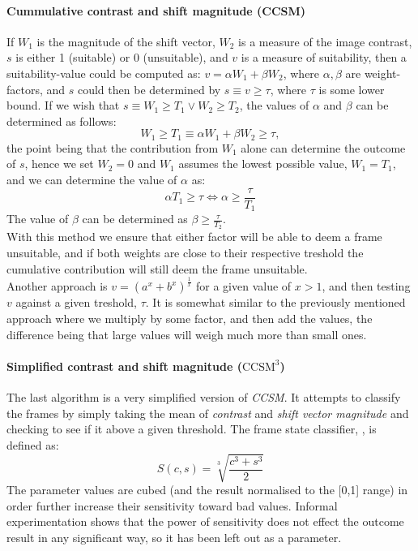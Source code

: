 \paragraph{Cummulative contrast and shift magnitude (CCSM)}
If $W_{1}$ is the magnitude of the shift vector, $W_{2}$ is a measure of the image contrast, $s$ is either 1 (suitable) or 0 (unsuitable), and $v$ is a measure of suitability, then a suitability-value could be computed as: $v = \alpha W_{1} + \beta W_{2}$, where $\alpha,\beta$ are weight-factors, and $s$ could then be determined by $s \equiv v \ge \tau$, where $\tau$ is some lower bound. If we wish that $s \equiv W_{1} \ge T_{1} \vee W_{2} \ge T_{2}$, the values of $\alpha$ and $\beta$ can be determined as follows:
%
\[
W_{1} \ge T_{1} \equiv \alpha W_{1} + \beta W_{2} \ge \tau,
\]
%
the point being that the contribution from $W_{1}$ alone can determine the outcome of $s$, hence we set $W_{2} = 0$ and $W_{1}$ assumes the lowest possible value, $W_{1} = T_{1}$, and we can determine the value of $\alpha$ as:
%
\[
\alpha T_{1} \ge \tau \Leftrightarrow \alpha \ge \frac{\tau}{T_{1}}
\]
%
The value of $\beta$ can be determined as $\beta \ge \frac{\tau}{T_{2}}$.\\
With this method we ensure that either factor will be able to deem a frame unsuitable, and if both weights are close to their respective treshold the cumulative contribution will still deem the frame unsuitable.\\
Another approach is $v = (a^x + b^x)^{\frac{1}{x}}$ for a given value of $x > 1$, and then testing $v$ against a given treshold, $\tau$. It is somewhat similar to the previously mentioned approach where we multiply by some factor, and then add the values, the difference being that large values will weigh much more than small ones.
%
\paragraph{Simplified contrast and shift magnitude ($\text{CCSM}^{3}$)}
%
The last algorithm is a very simplified version of \textit{CCSM}. It attempts to classify the frames by simply taking the mean of \textit{contrast} and \textit{shift vector magnitude} and checking to see if it above a given threshold. The frame state classifier, , is defined as:
\[
S(c,s)=\sqrt[3]{\frac{c^{3}+s^{3}}{2}}
\]
The parameter values are cubed (and the result normalised to the [0,1] range) in order further increase their sensitivity toward bad values. Informal experimentation shows that the power of sensitivity does not effect the outcome result in any significant way, so it has been left out as a parameter.
%
